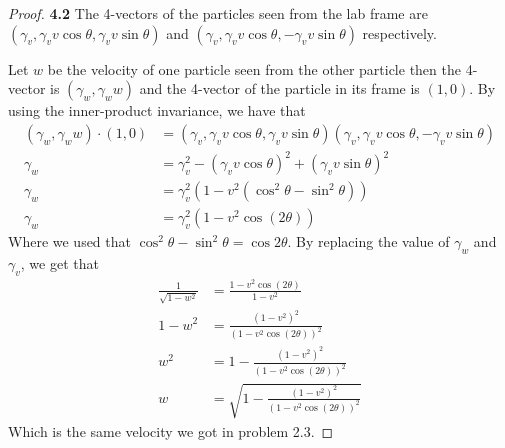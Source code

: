 \documentclass[11pt]{article}
\theoremstyle{definition}
\begin{document}
\begin{proof}{\textbf{4.2}}
    The 4-vectors of the particles seen from the lab frame are
    $(\gamma_v, \gamma_v v\cos\theta, \gamma_v v\sin\theta)$ and
    $(\gamma_v, \gamma_v v\cos\theta, -\gamma_v v\sin\theta)$ respectively.

    Let $w$ be the velocity of one particle seen from the other particle then
    the 4-vector is
    $(\gamma_w, \gamma_w w)$
    and the 4-vector of the particle in its frame is $(1, 0)$.
    By using the inner-product invariance, we have that
    \begin{align*}
        (\gamma_w, \gamma_w w)\cdot(1, 0) &=
        (\gamma_v, \gamma_v v\cos\theta, \gamma_v v\sin\theta)
        (\gamma_v, \gamma_v v\cos\theta, -\gamma_v v\sin\theta)\\
        \gamma_w &= \gamma_v^2 - (\gamma_v v\cos\theta)^2 + (\gamma_v v\sin\theta)^2\\
        \gamma_w &= \gamma_v^2(1 - v^2(\cos^2\theta - \sin^2\theta))\\
        \gamma_w &= \gamma_v^2(1 - v^2\cos(2\theta))
    \end{align*}
    Where we used that $\cos^2\theta - \sin^2\theta = \cos2\theta$.
    By replacing the value of $\gamma_w$ and $\gamma_v$,
    we get that
    \begin{align*}
        \frac{1}{\sqrt{1 - w^2}} &= \frac{1 - v^2\cos(2\theta)}{1 - v^2}\\
        1 - w^2 &= \frac{(1 - v^2)^2}{(1 - v^2\cos(2\theta))^2}\\
        w^2 &= 1 - \frac{(1 - v^2)^2}{(1 - v^2\cos(2\theta))^2}\\
        w &= \sqrt{1 - \frac{(1 - v^2)^2}{(1 - v^2\cos(2\theta))^2}}
    \end{align*}
    Which is the same velocity we got in problem 2.3.
\end{proof}
\cleardoublepage
\end{document}
